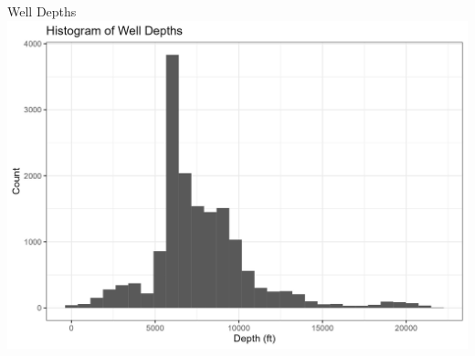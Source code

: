 \documentclass{beamer}
\begin{document}
\begin{frame}{Well Depths}
\label{depths}
\centering
    \includegraphics[scale=0.12]{Figures/DepthHistogram.jpg}\\
    \hyperlink{costcalc}{}
\end{frame}
\end{document}
